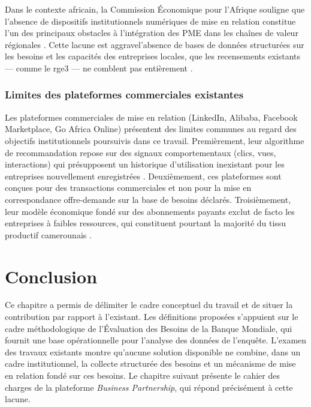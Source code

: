 \documentclass[12pt, a4paper, oneside]{report}
\begin{document}
Dans le contexte africain, la Commission \'Economique pour l'Afrique
souligne que l'absence de dispositifs institutionnels num\'eriques
de mise en relation constitue l'un des principaux obstacles \`a
l'int\'egration des PME dans les cha\^ines de valeur r\'egionales
\cite{uneca_digital_2023}. Cette lacune est aggravel'absence de
bases de donn\'ees structur\'ees sur les besoins et les capacit\'es
des entreprises locales, que les recensements existants --- comme
le \gls{rge}3 --- ne comblent pas enti\`erement \cite{ins2023}.

\subsubsection{Limites des plateformes commerciales existantes}

Les plateformes commerciales de mise en relation (LinkedIn, Alibaba,
Facebook Marketplace, Go Africa Online) pr\'esentent des limites
communes au regard des objectifs institutionnels poursuivis dans ce
travail. Premi\`erement, leur algorithme de recommandation repose
sur des signaux comportementaux (clics, vues, interactions) qui
pr\'esupposent un historique d'utilisation inexistant pour les
entreprises nouvellement enregistr\'ees \cite{ricci_2015}.
Deuxi\`emement, ces plateformes sont con\c{c}ues pour des
transactions commerciales et non pour la mise en correspondance
offre-demande sur la base de besoins d\'eclar\'es.
Troisi\`emement, leur mod\`ele \'economique fond\'e sur des
abonnements payants exclut de facto les entreprises \`a faibles
ressources, qui constituent pourtant la majorit\'e du tissu
productif camerounais \cite{ins2023}.
\section*{Conclusion}
Ce chapitre a permis de d\'elimiter le cadre conceptuel du travail
et de situer la contribution par rapport \`a l'existant. Les
d\'efinitions propos\'ees s'appuient sur le cadre m\'ethodologique
de l'\'Evaluation des Besoins de la Banque Mondiale, qui fournit
une base op\'erationnelle pour l'analyse des donn\'ees de l'enqu\^ete.
L'examen des travaux existants montre qu'aucune solution disponible
ne combine, dans un cadre institutionnel, la collecte structur\'ee
des besoins et un m\'ecanisme de mise en relation fond\'e sur ces
besoins. Le chapitre suivant pr\'esente le cahier des charges de
la plateforme \textit{Business Partnership}, qui r\'epond
pr\'ecis\'ement \`a cette lacune.
\end{document}
